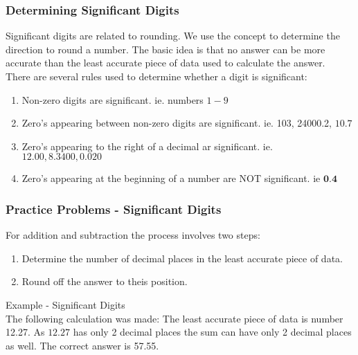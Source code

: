 \subsubsection{Determining Significant Digits}
Significant digits are related to rounding. We use the concept to determine the direction to round a number. The basic idea is that no answer can be more accurate than the least accurate piece of data used to calculate the answer.\\

There are several rules used to determine whether a digit is significant:\\

\begin{enumerate}
  \item Non-zero digits are significant. ie. numbers $1-9$

  \item Zero's appearing between non-zero digits are significant. ie. 103, 24000.2, $10.7$

  \item Zero's appearing to the right of a decimal ar significant. ie. $12.00,8.3400,0.020$

  \item Zero's appearing at the beginning of a number are NOT significant. ie $\mathbf{0 . 4}$

\end{enumerate}
\subsubsection{Practice Problems - Significant Digits}
For addition and subtraction the process involves two steps:

\begin{enumerate}
  \item Determine the number of decimal places in the least accurate piece of data.

  \item Round off the answer to theis position.

\end{enumerate}
Example - Significant Digits\\

The following calculation was made: The least accurate piece of data is number 12.27. As $12.27$ has only 2 decimal places the sum can have only 2 decimal places as well. The correct answer is 57.55.

